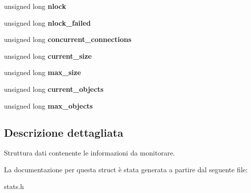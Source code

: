\begin{DoxyCompactItemize}
\item 
unsigned long {\bfseries nlock}\hypertarget{structstatistics_ac5c44d82b16d00e7f6eb7d64162bde6b}{}\label{structstatistics_ac5c44d82b16d00e7f6eb7d64162bde6b}

\item 
unsigned long {\bfseries nlock\+\_\+failed}\hypertarget{structstatistics_a3a2be58e1c3eccdd23469df4070697dd}{}\label{structstatistics_a3a2be58e1c3eccdd23469df4070697dd}

\item 
unsigned long {\bfseries concurrent\+\_\+connections}\hypertarget{structstatistics_a7bb318acbc8595f0be85cd45909c7d49}{}\label{structstatistics_a7bb318acbc8595f0be85cd45909c7d49}

\item 
unsigned long {\bfseries current\+\_\+size}\hypertarget{structstatistics_acc592409461ecabdf1076126edccce2c}{}\label{structstatistics_acc592409461ecabdf1076126edccce2c}

\item 
unsigned long {\bfseries max\+\_\+size}\hypertarget{structstatistics_ab8956bbbb0148facbac74299f8b6cd5e}{}\label{structstatistics_ab8956bbbb0148facbac74299f8b6cd5e}

\item 
unsigned long {\bfseries current\+\_\+objects}\hypertarget{structstatistics_a1a23a8b57e7ca1ecf4d49197a5a56ad2}{}\label{structstatistics_a1a23a8b57e7ca1ecf4d49197a5a56ad2}

\item 
unsigned long {\bfseries max\+\_\+objects}\hypertarget{structstatistics_a21df893122b02d52a27f48df6032d0ef}{}\label{structstatistics_a21df893122b02d52a27f48df6032d0ef}

\end{DoxyCompactItemize}


\subsection{Descrizione dettagliata}
Struttura dati contenente le informazioni da monitorare. 

La documentazione per questa struct è stata generata a partire dal seguente file\+:\begin{DoxyCompactItemize}
\item 
stats.\+h\end{DoxyCompactItemize}
